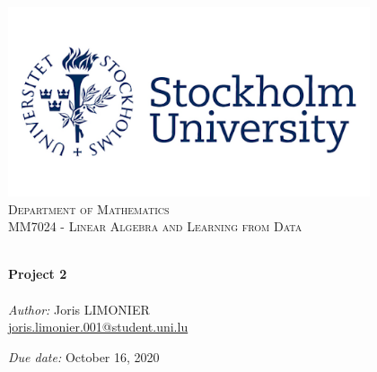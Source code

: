 \begin{titlepage}
\begin{center}
\includegraphics[width=0.8\textwidth]{Images/stockholm_university_logo.png}\\[0.8cm]
\vspace{1cm}
\textsc{\LARGE Department of Mathematics}\\[1cm]
\textsc{\Large MM7024 - Linear Algebra and Learning from Data}\\[1cm]
\vspace{0.8cm}

\HRule \\[0.6cm]
{ \huge \bfseries Project 2}\\[0.4cm]
\HRule \\[1.5cm]

\large
\emph{Author:} Joris LIMONIER\\
\vbox{}
\href{mailto:joris.limonier.001@student.uni.lu}{joris.limonier.001@student.uni.lu}\\

\vfill

\emph{Due date:} {\large October 16, 2020}
\end{center}
\end{titlepage}














